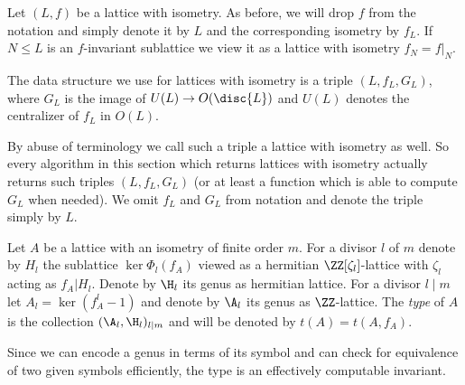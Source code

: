 Let $(L,f)$ be a lattice with isometry. As before, we will drop $f$ from the notation and simply denote it by $L$ and the corresponding isometry by $f_L$.
If $N \leq L$ is an $f$-invariant sublattice we view it as a lattice with isometry $f_N = f|_N$.

The data structure we use for lattices with isometry is a triple
$(L,f_L,G_L)$, where $G_L$ is the image of $U(L) \to O(\disc{L})$ and $U(L)$ denotes the centralizer of $f_L$ in $O(L)$.

By abuse of terminology we call such a triple a lattice with isometry as well.
So every algorithm in this section which returns lattices with isometry actually returns such triples $(L,f_L,G_L)$ (or at least a function which is able to compute $G_L$ when needed). We omit $f_L$ and $G_L$ from notation and denote the triple simply by $L$.

\begin{definition}
 Let $A$ be a lattice with an isometry of finite order $m$.
 For a divisor $l$ of $m$ denote by $H_l$ the sublattice $\ker \Phi_{l}(f_A)$ viewed as a hermitian $\ZZ[\zeta_l]$-lattice with $\zeta_l$ acting as $f_A|H_l$. Denote by $\H_l$ its genus as hermitian lattice.
 For a divisor $l \mid m$ let $A_l = \ker (f_A^l-1)$ and denote by $\A_l$ its genus as $\ZZ$-lattice. The \emph{type} of $A$ is the collection $(\A_l,\H_l)_{l \mid m}$ and will be denoted by $t(A) = t(A, f_A)$.
\end{definition}

Since we can encode a genus in terms of its symbol and can check for equivalence of two given symbols efficiently, the type is an effectively computable invariant.

